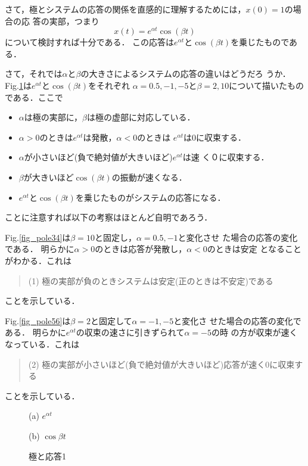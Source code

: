 さて，極とシステムの応答の関係を直感的に理解するためには，$x(0)=1$の場合の応
答の{実部}，つまり
\begin{equation}
 x(t) = e^{\alpha t} \cos(\beta t)
\end{equation}
について検討すれば十分である．
この応答は$e^{\alpha t}$と$\cos(\beta t)$を乗じたものである．

さて，それでは$\alpha$と$\beta$の大きさによるシステムの応答の違いはどうだろ
うか．Fig.\ref{fig_pole12}は$e^{\alpha t}$と$\cos(\beta t)$をそれぞれ
$\alpha=0.5, -1, -5$と$\beta=2, 10$について描いたものである．ここで
\begin{itemize}
 \item $\alpha$は極の実部に，$\beta$は極の虚部に対応している．
 \item $\alpha>0$のときは$e^{\alpha t}$は発散，$\alpha<0$のときは
       $e^{\alpha t}$は$0$に収束する．
 \item $\alpha$が小さいほど(負で絶対値が大きいほど)$e^{\alpha t}$は速
       く０に収束する．
 \item $\beta$が大きいほど$\cos(\beta t)$の振動が速くなる．
 \item $e^{\alpha t}$と$ \cos(\beta t)$を乗じたものがシステムの応答になる．
\end{itemize}
ことに注意すれば以下の考察はほとんど自明であろう．

Fig.\ref{fig_pole34}は$\beta = 10$と固定し，$\alpha = 0.5, -1$と変化させ
た場合の応答の変化である．
明らかに$\alpha > 0$のときは応答が発散し，$\alpha < 0$のときは安定
となることがわかる．これは
\begin{quote}
 (1) 極の実部が負のときシステムは安定(正のときは不安定)である
\end{quote}
ことを示している．

Fig.\ref{fig_pole56}は$\beta = 2$と固定して$\alpha = -1, -5$と変化さ
せた場合の応答の変化である．
明らかに$e^{\alpha t}$の収束の速さに引きずられて$\alpha=-5$の時
の方が収束が速くなっている．これは
\begin{quote}
 (2) 極の実部が小さいほど(負で絶対値が大きいほど)応答が速く0に収束する
\end{quote}
ことを示している． 

\begin{figure}[t!]
 \begin{minipage}{0.5\textwidth}
  \begin{center}
   (a) $e^{\alpha t}$
  \end{center}
 \end{minipage}%
 \begin{minipage}{0.5\textwidth}
  \begin{center}
   (b) $\cos \beta t$
  \end{center}
 \end{minipage}
 \caption{極と応答1}
 \label{fig_pole12}
\end{figure}

